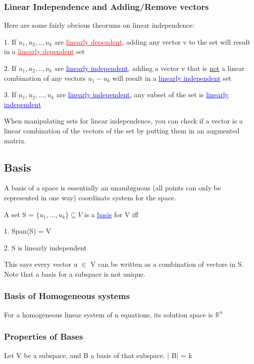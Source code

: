 \documentclass{article}
\newcommand{\bul}[1]{\textcolor{blue}{\underline{#1}}}
\newcommand{\rul}[1]{\textcolor{red}{\underline{#1}}}
\newcommand{\sbreak}{\vspace{10pt}}
\begin{document}
\subsubsection{Linear Independence and Adding/Remove vectors}
Here are some fairly obvious theorums on linear independence:

1. If ${u_1,u_2,..,u_k}$ are \rul{linearly dependent}, adding any vector v to the set will result in a \rul{linearly dependent} set

2. If ${u_1,u_2,..,u_k}$ are \bul{linearly independent}, adding a vector v that is \underline{not} a linear combination of any vectors $u_1 - u_k$ will result in a \bul{linearly independent} set

3. If ${u_1,u_2,...,u_k}$ are \bul{linearly independent}, any subset of the set is \bul{linearly independent}

When manipulating sets for linear independence, you can check if a vector is a linear combination of the vectors of the set by putting them in an augmented matrix.


\subsection{Basis}
A basis of a space is essentially an unambiguous (all points can only be represented in one way) coordinate system for the space.

\sbreak

A set S = $\{u_1,...,u_k\}\subseteq V$ is a \bul{basis} for V iff

\sbreak

1. Span(S) = V

2. S is linearly independent

\sbreak

This says every vector u $\in$ V can be written as a combination of vectors in S. Note that a basis for a subspace is not unique.

\subsubsection{Basis of Homogeneous systems}
For a homogeneous linear system of n equations, its solution space is $\mathbb{R}^n$

\subsubsection{Properties of Bases}
Let V be a subspace, and B a basis of that subspace. $\mid$ B$\mid$ = k
\end{document}
